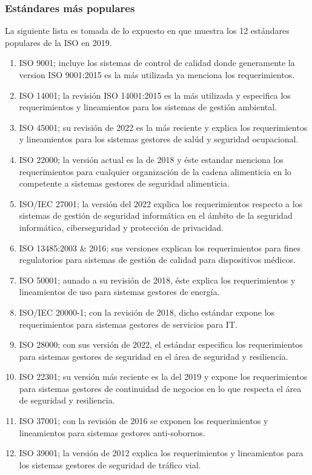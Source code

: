 \subsubsection{Estándares más populares}
La siguiente lista es tomada de lo expuesto en %
que muestra los 12 estándares populares de la ISO en 2019.
\begin{enumerate}
    \item ISO 9001; incluye los sistemas de control de calidad donde generamente la version ISO 9001:2015 es la más utilizada ya menciona los requerimientos. %
    \item ISO 14001; la revisión ISO 14001:2015 es la más utilizada y especifica los requerimientos y lineamientos para los sistemas de gestión ambiental. %
    \item ISO 45001; su revisión de 2022 es la más reciente y explica los requerimientos y lineamientos para los sistemas gestores de salúd y seguridad ocupacional. %
    \item ISO 22000; la versión actual es la de 2018 y éste estandar menciona los requerimientos para cualquier organización de la cadena alimenticia en lo competente a sistemas gestores de seguridad alimenticia. %
    \item ISO/IEC 27001; la versión del 2022 explica los requerimientos respecto a los sistemas de gestión de seguridad informática en el ámbito de la seguridad informática, ciberseguridad y protección de privacidad. %
    \item ISO 13485:2003 \& 2016; sus versiones explican los requerimientos para fines regulatorios para sistemas de gestión de calidad para dispositivos médicos. %
    \item ISO 50001; aunado a su revisión de 2018, éste explica los requerimientos y lineamientos de uso para sistemas gestores de energía. %
    \item ISO/IEC 20000-1; con la revisión de 2018, dicho estándar expone los requerimientos para sistemas gestores de servicios para IT. %
    \item ISO 28000; con sus versión de 2022, el estándar especifica los requerimientos para sistemas gestores de seguridad en el área de seguridad y resiliencia. %
    \item ISO 22301; su versión más reciente es la del 2019 y expone los requerimientos para sistemas gestores de continuidad de negocios en lo que respecta el área de seguridad y resiliencia. %
    \item ISO 37001; con la revisión de 2016 se exponen los requerimientos y lineamientos para sistemas gestores anti-sobornos. %
    \item ISO 39001; la versión de 2012 explica los requerimientos y lineamientos para los sistemas gestores de seguridad de tráfico vial. %
\end{enumerate}

